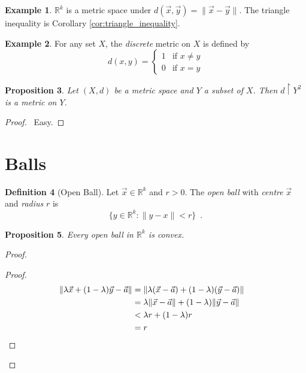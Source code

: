 \documentclass{book}
\let\qed\relax
\newtheorem{prop}{Proposition}[chapter]
\theoremstyle{definition}
\newtheorem{df}[prop]{Definition}
\newtheorem{ex}[prop]{Example}
\begin{document}
\begin{ex}
$\mathbb{R}^k$ is a metric space under $d(\vec{x},\vec{y}) = \| \vec{x} - \vec{y} \|$. The triangle inequality is Corollary \ref{cor:triangle_inequality}.
\end{ex}

\begin{ex}
For any set $X$, the \emph{discrete} metric on $X$ is defined by
\[ d(x,y) = \begin{cases}
1 & \text{if } x \neq y \\
0 & \text{if } x = y
\end{cases} \]
\end{ex}

\begin{prop}
Let $(X,d)$ be a metric space and $Y$ a subset of $X$. Then $d \restriction Y^2$ is a metric on $Y$.
\end{prop}

\begin{proof}
\pf\ Easy. \qed
\end{proof}

\section{Balls}

\begin{df}[Open Ball]
Let $\vec{x} \in \mathbb{R}^k$ and $r > 0$. The \emph{open ball} with \emph{centre} $\vec{x}$ and \emph{radius} $r$ is
\[ \{ y \in \mathbb{R}^k : \| y - x \| < r \} \enspace . \]
\end{df}

\begin{prop}
Every open ball in $\mathbb{R}^k$ is convex.
\end{prop}

\begin{proof}
\pf
{}
\begin{proof}
\pf
\begin{align*}
\| \lambda \vec{x} + (1 - \lambda) \vec{y} - \vec{a} \|
& = \| \lambda (\vec{x} - \vec{a}) + (1 - \lambda) (\vec{y} - \vec{a}) \| \\
& = \lambda \| \vec{x} - \vec{a} \| + (1 - \lambda) \| \vec{y} - \vec{a} \| \\
& < \lambda r + (1 - \lambda) r \\
& = r & \qed
\end{align*}
\end{proof}
\qed
\end{proof}
\end{document}
